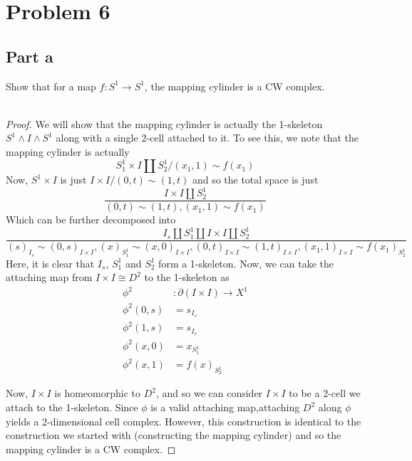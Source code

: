 \documentclass[fontsize=11pt]{scrartcl} %
\numberwithin{equation}{section} %
\numberwithin{figure}{section} %
\numberwithin{table}{section} %
\begin{document}
\section*{Problem 6}
\subsection*{Part a}
Show that for a map $f:S^1\to S^1$, the mapping cylinder is a CW complex.
\\
\\
\begin{proof}
    We will show that the mapping cylinder is actually the 1-skeleton $S^1\wedge
    I\wedge S^1$ along with a single $2$-cell attached to it. To see this, we
    note that the mapping cylinder is actually
    \[
        S^1_1\times I \coprod S^1_2/{(x_1,1)\sim f(x_1)}
    \]
    Now, $S^1\times I$ is just $I\times I/{(0,t)\sim (1,t)}$ and so the total
    space is just
    \[
        \frac{I\times I \coprod S^1_2}{(0,t)\sim (1,t), (x_1,1)\sim f(x_1)}
    \]
    Which can be further decomposed into
    \[
        \frac{I_s\coprod S^1_1\coprod I\times I\coprod S^1_2}
        {(s)_{I_s}\sim(0,s)_{I\times I}, (x)_{S^1_1}\sim (x,0)_{I\times I},
        (0,t)_{I\times I}\sim (1,t)_{I\times I}, (x_1,1)_{I\times I}\sim
        f(x_1)_{S^1_2}}
    \]
    Here, it is clear that $I_s$, $S^1_1$ and $S^1_2$ form a 1-skeleton. Now, we
    can take the attaching map from $I\times I\cong D^2$ to the 1-skeleton as
    \[
        \begin{aligned}
            \phi^2&:\partial(I\times I)\to X^1\\
            \phi^2(0,s) &= s_{I_s}\\
            \phi^2(1,s) &= s_{I_s}\\
            \phi^2(x,0) &= x_{S^1_1}\\
            \phi^2(x,1) &= f(x)_{S^1_2}
        \end{aligned}
    \]

    Now, $I\times I$ is homeomorphic to $D^2$, and so we can consider $I\times
    I$ to be a 2-cell we attach to the 1-skeleton. Since $\phi$ is a valid
    attaching map,attaching $D^2$ along $\phi$ yields a 2-dimensional cell
    complex. However, this construction is identical to the construction we
    started with (constructing the mapping cylinder) and so the mapping cylinder
    is a CW complex.
\end{proof}
\end{document}

